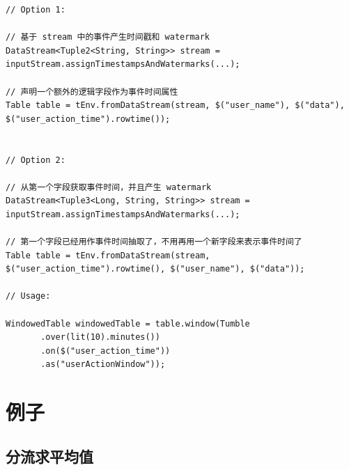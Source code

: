 \documentclass[cn,11pt,chinese]{elegantbook}
\begin{document}
\begin{verbatim}
// Option 1:

// 基于 stream 中的事件产生时间戳和 watermark
DataStream<Tuple2<String, String>> stream = inputStream.assignTimestampsAndWatermarks(...);

// 声明一个额外的逻辑字段作为事件时间属性
Table table = tEnv.fromDataStream(stream, $("user_name"), $("data"), $("user_action_time").rowtime());


// Option 2:

// 从第一个字段获取事件时间，并且产生 watermark
DataStream<Tuple3<Long, String, String>> stream = inputStream.assignTimestampsAndWatermarks(...);

// 第一个字段已经用作事件时间抽取了，不用再用一个新字段来表示事件时间了
Table table = tEnv.fromDataStream(stream, $("user_action_time").rowtime(), $("user_name"), $("data"));

// Usage:

WindowedTable windowedTable = table.window(Tumble
       .over(lit(10).minutes())
       .on($("user_action_time"))
       .as("userActionWindow"));
\end{verbatim}

\section{例子}

\subsection{分流求平均值}
\end{document}
